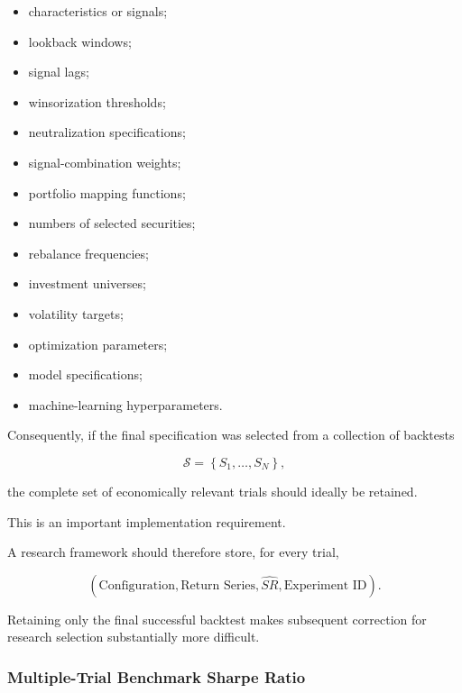 \documentclass[11pt,a4paper]{article}
\begin{document}
\begin{itemize}
    \item characteristics or signals;
    \item lookback windows;
    \item signal lags;
    \item winsorization thresholds;
    \item neutralization specifications;
    \item signal-combination weights;
    \item portfolio mapping functions;
    \item numbers of selected securities;
    \item rebalance frequencies;
    \item investment universes;
    \item volatility targets;
    \item optimization parameters;
    \item model specifications;
    \item machine-learning hyperparameters.
\end{itemize}

Consequently, if the final specification was selected from a collection of
backtests

\begin{equation}
\mathcal{S}
=
\left\{
S_1,\ldots,S_N
\right\},
\end{equation}

the complete set of economically relevant trials should ideally be retained.

This is an important implementation requirement.

A research framework should therefore store, for every trial,

\begin{equation}
\boxed{
\left(
\text{Configuration},
\text{Return Series},
\widehat{SR},
\text{Experiment ID}
\right).
}
\end{equation}

Retaining only the final successful backtest makes subsequent correction for
research selection substantially more difficult.


\subsubsection{Multiple-Trial Benchmark Sharpe Ratio}
\end{document}
